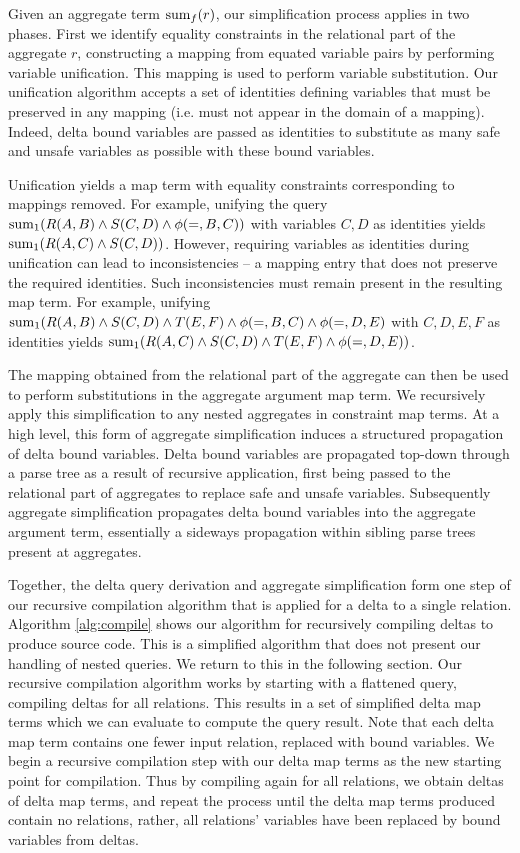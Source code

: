 Given an aggregate term $\mathrm{sum}_{f}(r)$, our simplification process applies in
two phases. First we identify equality constraints in the relational part of the
aggregate $r$, constructing a mapping from equated variable pairs by performing
variable unification. This mapping is used to perform variable substitution. Our
unification algorithm accepts a set of identities defining variables that must
be preserved in any mapping (i.e. must not appear in the domain of a
mapping). Indeed, delta bound variables are passed as identities to substitute
as many safe and unsafe variables as possible with these bound
variables.

Unification yields a map term with equality constraints corresponding
to mappings removed. 
For example, unifying the query
$\mathrm{sum}_{1}(R(A,B) \wedge S(C,D) \wedge \phi(=,B,C))$
with variables $C,D$ as identities yields $\mathrm{sum}_{1}(R(A,C) \wedge S(C,D))$.
However, requiring variables as identities during
unification can lead to inconsistencies -- a mapping entry that does not
preserve the required identities. Such inconsistencies must remain present in
the resulting map term.
For example, unifying
$\mathrm{sum}_{1}(R(A,B) \wedge S(C,D) \wedge T(E,F) \wedge \phi(=,B,C) \wedge
\phi(=,D,E)$ with $C,D,E,F$ as identities yields
 $\mathrm{sum}_{1}(R(A,C) \wedge S(C,D) \wedge T(E,F) \wedge \phi(=,D,E))$.

The mapping obtained from the relational part of the aggregate can then be used
to perform substitutions in the aggregate argument map term. We recursively
apply this simplification to any nested aggregates in constraint map terms.
At a high level, this form of aggregate simplification induces a structured
propagation of delta bound variables. Delta bound variables are propagated
top-down through a parse tree as a result of recursive application, first being
passed to the relational part of aggregates to replace safe and unsafe
variables. Subsequently aggregate simplification propagates delta bound
variables into the aggregate argument term, essentially a sideways propagation
within sibling parse trees present at aggregates.


Together, the delta query derivation and aggregate simplification form one step
of our recursive compilation algorithm that is applied for a delta to a single
relation. 
Algorithm \ref{alg:compile} shows our algorithm for recursively compiling deltas
to produce source code. This is a simplified algorithm that does not present our
handling of nested queries. We return to this in the following section.
Our recursive compilation algorithm works by starting with a flattened
query, compiling deltas for all relations. This results in a set of simplified
delta map terms which we can evaluate to compute the query result. Note that
each delta map term contains one fewer input relation, replaced with bound
variables. We begin a recursive compilation step with our delta map
terms as the new starting point for compilation. Thus by compiling again for
all relations, we obtain deltas of delta map terms, and repeat the process until
the delta map terms produced contain no relations, rather, all relations'
variables have been replaced by bound variables from deltas.

